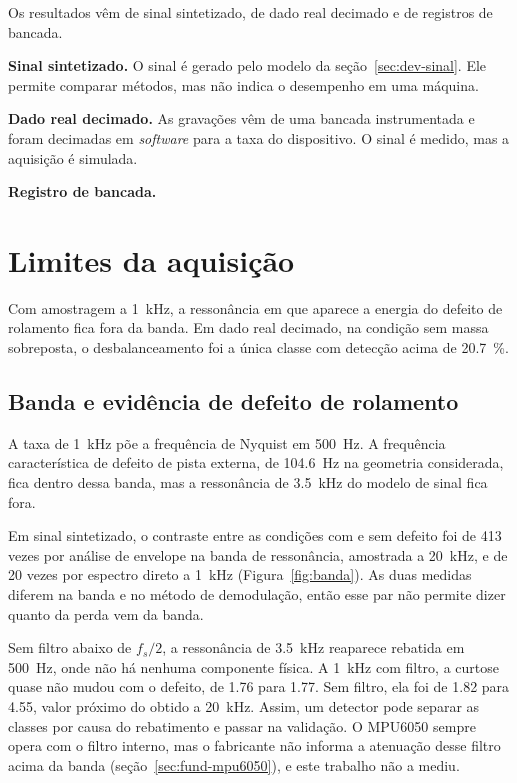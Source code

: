 Os resultados vêm de sinal sintetizado, de dado real decimado e de registros de bancada.

\textbf{Sinal sintetizado.} O sinal é gerado pelo modelo da seção~\ref{sec:dev-sinal}. Ele
        permite comparar métodos, mas não indica o desempenho em uma máquina.

\textbf{Dado real decimado.} As gravações vêm de uma bancada instrumentada e foram decimadas
        em \emph{software} para a taxa do dispositivo. O sinal é medido, mas a aquisição é
        simulada.

\textbf{Registro de bancada.} 

\section{Limites da aquisição}
\label{sec:res-aquisicao}

Com amostragem a \SI{1}{\kilo\hertz}, a ressonância em que aparece a energia do defeito de
rolamento fica fora da banda. Em dado real decimado, na condição sem massa sobreposta, o
desbalanceamento foi a única classe com detecção acima de \SI{20,7}{\percent}.

\subsection{Banda e evidência de defeito de rolamento}

A taxa de \SI{1}{\kilo\hertz} põe a frequência de Nyquist em \SI{500}{\hertz}. A frequência
característica de defeito de pista externa, de \SI{104,6}{\hertz} na geometria considerada,
fica dentro dessa banda, mas a ressonância de \SI{3,5}{\kilo\hertz} do modelo de sinal fica
fora.

Em sinal sintetizado, o contraste entre as condições com e sem defeito foi de \num{413}
vezes por análise de envelope na banda de ressonância, amostrada a \SI{20}{\kilo\hertz}, e
de \num{20} vezes por espectro direto a \SI{1}{\kilo\hertz} (Figura~\ref{fig:banda}). As
duas medidas diferem na banda e no método de demodulação, então esse par não permite dizer
quanto da perda vem da banda.

Sem filtro abaixo de $f_s/2$, a ressonância de \SI{3,5}{\kilo\hertz} reaparece rebatida em
\SI{500}{\hertz}, onde não há nenhuma componente física. A \SI{1}{\kilo\hertz} com filtro, a
curtose quase não mudou com o defeito, de \num{1,76} para \num{1,77}. Sem filtro, ela foi de
\num{1,82} para \num{4,55}, valor próximo do obtido a \SI{20}{\kilo\hertz}. Assim, um detector
pode separar as classes por causa do rebatimento e passar na validação. O MPU6050 sempre opera
com o filtro interno, mas o fabricante não informa a atenuação desse filtro acima da banda
(seção~\ref{sec:fund-mpu6050}), e este trabalho não a mediu.

